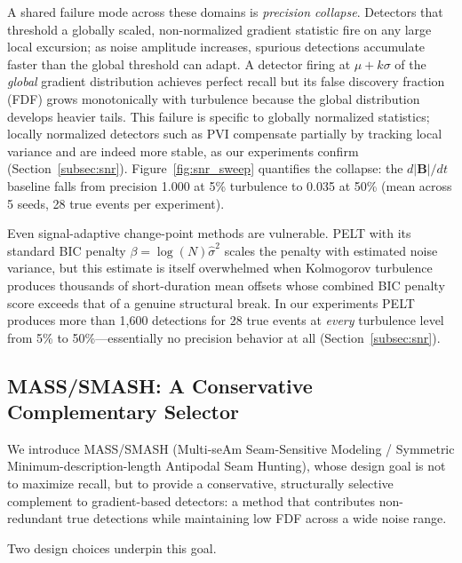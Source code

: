 \documentclass[12pt,letterpaper]{article}
\begin{document}
A shared failure mode across these domains is \emph{precision collapse}.
Detectors that threshold a globally scaled, non-normalized gradient statistic
fire on any large local excursion; as noise amplitude increases, spurious
detections accumulate faster than the global threshold can adapt.
A detector firing at $\mu + k\sigma$ of the \emph{global} gradient
distribution achieves perfect recall but its false discovery fraction (FDF)
grows monotonically with turbulence because the global distribution develops
heavier tails.
This failure is specific to globally normalized statistics; locally normalized
detectors such as PVI compensate partially by tracking local variance and are
indeed more stable, as our experiments confirm (Section~\ref{subsec:snr}).
Figure~\ref{fig:snr_sweep} quantifies the collapse: the $d|\mathbf{B}|/dt$
baseline falls from precision 1.000 at 5\% turbulence to 0.035 at 50\%
(mean across 5 seeds, 28 true events per experiment).

Even signal-adaptive change-point methods are vulnerable.
PELT \citep{Killick2012} with its standard BIC penalty
$\beta = \log(N)\hat{\sigma}^2$ scales the penalty with estimated noise
variance, but this estimate is itself overwhelmed when Kolmogorov turbulence
produces thousands of short-duration mean offsets whose combined BIC penalty
score exceeds that of a genuine structural break.
In our experiments PELT produces more than 1{,}600 detections for 28 true
events at \emph{every} turbulence level from 5\% to 50\%---essentially
no precision behavior at all (Section~\ref{subsec:snr}).

\subsection{MASS/SMASH: A Conservative Complementary Selector}

We introduce MASS/SMASH (Multi-seAm Seam-Sensitive Modeling /
Symmetric Minimum-description-length Antipodal Seam Hunting), whose design
goal is not to maximize recall, but to provide a conservative, structurally
selective complement to gradient-based detectors: a method that contributes
non-redundant true detections while maintaining low FDF across a wide noise
range.

Two design choices underpin this goal.
\end{document}
